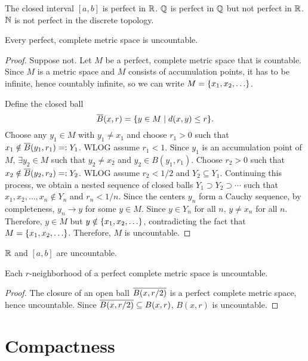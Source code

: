 \begin{ex}
    The closed interval $[a, b]$ is perfect in $\R$. $\Q$ is perfect in $\Q$ but not perfect in $\R$. $\N$ is not perfect in the discrete topology.
\end{ex}

\begin{thm}
    \label{thm:perfect-complete-uncountable}
    Every perfect, complete metric space is uncountable.
    \begin{proof}
        Suppose not. Let $M$ be a perfect, complete metric space that is countable. Since $M$ is a metric space and $M$ consists of accumulation points, it has to be infinite, hence countably infinite, so we can write $M = \set{x_1, x_2, \ldots}$.

        Define the closed ball
        \[
        \Bar B(x, r) = \set{y \in M \mid d(x, y) \leq r}.
        \]
        Choose any $y_1 \in M$ with $y_1 \neq x_1$ and choose $r_1 > 0$ such that $x_1 \notin \Bar B(y_1, r_1) =: Y_1$. WLOG assume $r_1 < 1$. Since $y_1$ is an accumulation point of $M$, $\exists y_2 \in M$ such that $y_2 \neq x_2$ and $y_2 \in B(y_1, r_1)$. Choose $r_2 > 0$ such that $x_2 \notin \Bar B(y_2, r_2) =: Y_2$. WLOG assume $r_2 < 1/2$ and $Y_2 \subseteq Y_1$. Continuing this process, we obtain a nested sequence of closed balls $Y_1 \supset Y_2 \supset \cdots$ such that $x_1, x_2, \ldots, x_n \notin Y_n$ and $r_n < 1/n$. Since the centers $y_n$ form a Cauchy sequence, by completeness, $y_n \to y$ for some $y \in M$. Since $y \in Y_n$ for all $n$, $y \neq x_n$ for all $n$. Therefore, $y \in M$ but $y \notin \set{x_1, x_2, \ldots}$, contradicting the fact that $M = \set{x_1, x_2, \ldots}$. Therefore, $M$ is uncountable.
    \end{proof}
\end{thm}

\begin{cl}
    $\R$ and $[a, b]$ are uncountable.
\end{cl}

\begin{cl}
    Each $r$-neighborhood of a perfect complete metric space is uncountable.
    \begin{proof}
        The closure of an open ball $\Bar{B(x, r/2)}$ is a perfect complete metric space, hence uncountable. Since $\Bar{B(x, r/2)} \subseteq B(x, r)$, $B(x, r)$ is uncountable.
    \end{proof}
\end{cl}

\chapter{Compactness}

